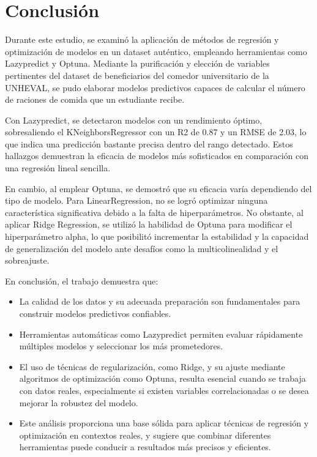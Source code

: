 \documentclass{article}
\begin{document}
\section{Conclusión}

Durante este estudio, se examinó la aplicación de métodos de regresión y optimización de modelos en un dataset auténtico, empleando herramientas como Lazypredict y Optuna.  Mediante la purificación y elección de variables pertinentes del dataset de beneficiarios del comedor universitario de la UNHEVAL, se pudo elaborar modelos predictivos capaces de calcular el número de raciones de comida que un estudiante recibe.

 Con Lazypredict, se detectaron modelos con un rendimiento óptimo, sobresaliendo el KNeighborsRegressor con un R2 de 0.87 y un RMSE de 2.03, lo que indica una predicción bastante precisa dentro del rango detectado.  Estos hallazgos demuestran la eficacia de modelos más sofisticados en comparación con una regresión lineal sencilla.

En cambio, al emplear Optuna, se demostró que su eficacia varía dependiendo del tipo de modelo.  Para LinearRegression, no se logró optimizar ninguna característica significativa debido a la falta de hiperparámetros.  No obstante, al aplicar Ridge Regression, se utilizó la habilidad de Optuna para modificar el hiperparámetro alpha, lo que posibilitó incrementar la estabilidad y la capacidad de generalización del modelo ante desafíos como la multicolinealidad y el sobreajuste.

En conclusión, el trabajo demuestra que:
\begin{itemize}
    \item La calidad de los datos y su adecuada preparación son fundamentales para construir modelos predictivos confiables.
    \item Herramientas automáticas como Lazypredict permiten evaluar rápidamente múltiples modelos y seleccionar los más prometedores.
    \item El uso de técnicas de regularización, como Ridge, y su ajuste mediante algoritmos de optimización como Optuna, resulta esencial cuando se trabaja con datos reales, especialmente si existen variables correlacionadas o se desea mejorar la robustez del modelo.
    \item Este análisis proporciona una base sólida para aplicar técnicas de regresión y optimización en contextos reales, y sugiere que combinar diferentes herramientas puede conducir a resultados más precisos y eficientes.


\end{itemize}
\end{document}
